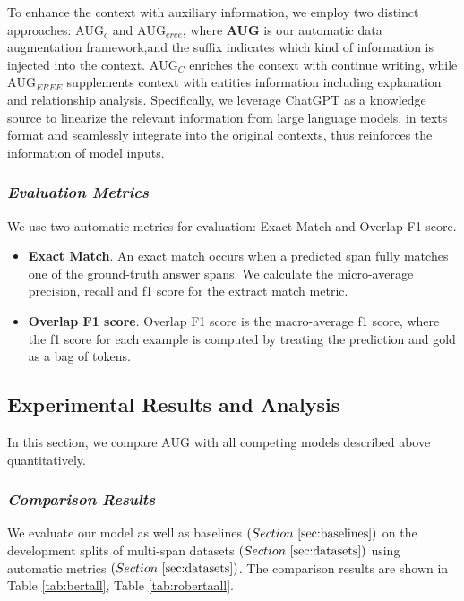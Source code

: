 \documentclass[mathematics,article,submit,moreauthors]{Definitions/mdpi}
\newcommand{\1}[1]{\mathds{1}\left[#1\right]}
\begin{document}
	To enhance the context with auxiliary information, we employ two distinct   approaches: \textbf{$\text{AUG}_{c}$} and \textbf{$\text{AUG}_{eree}$}, where \textbf{AUG} is our automatic data augmentation framework,and the suffix indicates which kind of information is injected into the context. \textbf{$\text{AUG}_{C}$} enriches the context with continue writing, while \textbf{$\text{AUG}_{EREE}$} supplements context with entities information including explanation and relationship analysis.
	Specifically, we leverage ChatGPT as a knowledge source to linearize the relevant information from large language models. in texts format and seamlessly integrate into the original contexts, thus reinforces the information of model inputs.

	
	\subsubsection{\textit{Evaluation Metrics}}
	\label{sec:metrics}
	We use two automatic metrics for evaluation: Exact Match and Overlap F1 score.
	\begin{itemize}
		\item \textbf{Exact Match}. An exact match occurs when a predicted span fully matches one of the ground-truth
		answer spans. We calculate the micro-average precision, recall and f1 score for the extract match
		metric.
		
		\item \textbf{Overlap F1 score}. Overlap F1 score is the macro-average f1 score, where the f1 score for each
		example is computed by treating the prediction and gold as a bag of tokens.
	\end{itemize}

\subsection{Experimental Results and Analysis}
	In this section, we compare $\text{AUG}$ with all competing models described above quantitatively.
	
	\subsubsection{\textit{Comparison Results}}
	We evaluate our model as well as baselines 
	\(( Section ~\ref{sec:baselines} )\) on the development splits of multi-span datasets \(( Section  ~\ref{sec:datasets})\) using automatic metrics \(( Section ~\ref{sec:datasets})\). The comparison results are shown in Table \ref{tab:bertall}, Table \ref{tab:robertaall}.
	
\end{document}
